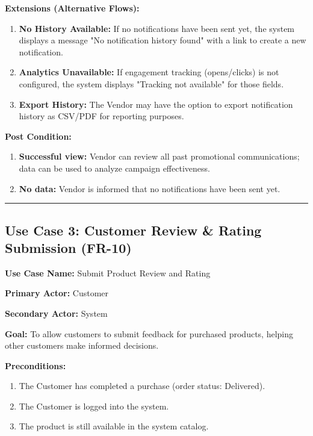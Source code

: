 \textbf{Extensions (Alternative Flows):}
\begin{enumerate}
    \item[2a.] \textbf{No History Available:} If no notifications have been sent yet, the system displays a message "No notification history found" with a link to create a new notification.
    \item[3a.] \textbf{Analytics Unavailable:} If engagement tracking (opens/clicks) is not configured, the system displays "Tracking not available" for those fields.
    \item[5a.] \textbf{Export History:} The Vendor may have the option to export notification history as CSV/PDF for reporting purposes.
\end{enumerate}

\textbf{Post Condition:}
\begin{enumerate}
    \item \textbf{Successful view:} Vendor can review all past promotional communications; data can be used to analyze campaign effectiveness.
    \item \textbf{No data:} Vendor is informed that no notifications have been sent yet.
\end{enumerate}

\vspace{0.5cm}
\hrule
\vspace{0.5cm}

\subsection*{Use Case 3: Customer Review \& Rating Submission (FR-10)}

\textbf{Use Case Name:} Submit Product Review and Rating

\textbf{Primary Actor:} Customer

\textbf{Secondary Actor:} System

\textbf{Goal:} To allow customers to submit feedback for purchased products, helping other customers make informed decisions.

\textbf{Preconditions:}
\begin{enumerate}
    \item The Customer has completed a purchase (order status: Delivered).
    \item The Customer is logged into the system.
    \item The product is still available in the system catalog.
\end{enumerate}

